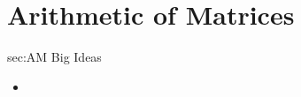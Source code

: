 \chapter{Arithmetic of Matrices}
\label{chap:AM}

\begin{bigideas}{sec:AM Big Ideas}
\begin{itemize}
  \item 
\end{itemize}
\end{bigideas}